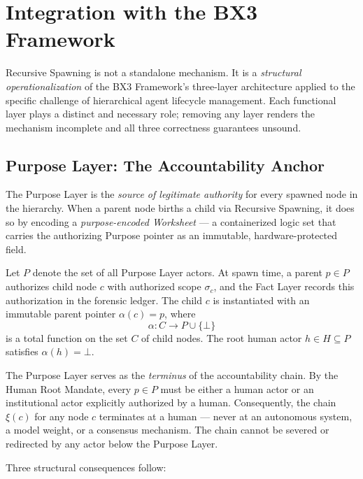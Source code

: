 \section{Integration with the BX3 Framework}
\label{sec:bx3-integration}

Recursive Spawning is not a standalone mechanism. It is a \textit{structural operationalization} of the BX3 Framework's three-layer architecture applied to the specific challenge of hierarchical agent lifecycle management. Each functional layer plays a distinct and necessary role; removing any layer renders the mechanism incomplete and all three correctness guarantees unsound.

\subsection{Purpose Layer: The Accountability Anchor}
\label{sec:purpose-anchor}

The Purpose Layer is the \textit{source of legitimate authority} for every spawned node in the hierarchy. When a parent node births a child via Recursive Spawning, it does so by encoding a \textit{purpose-encoded Worksheet} — a containerized logic set that carries the authorizing Purpose pointer as an immutable, hardware-protected field.

Let $P$ denote the set of all Purpose Layer actors. At spawn time, a parent $p \in P$ authorizes child node $c$ with authorized scope $\sigma_c$, and the Fact Layer records this authorization in the forensic ledger. The child $c$ is instantiated with an immutable parent pointer $\alpha(c) = p$, where
\begin{equation}
\alpha : C \rightarrow P \cup \{\bot\}
\tag{1}
\end{equation}
is a total function on the set $C$ of child nodes. The root human actor $h \in H \subseteq P$ satisfies $\alpha(h) = \bot$.

The Purpose Layer serves as the \textit{terminus} of the accountability chain. By the Human Root Mandate, every $p \in P$ must be either a human actor or an institutional actor explicitly authorized by a human. Consequently, the chain $\xi(c)$ for any node $c$ terminates at a human — never at an autonomous system, a model weight, or a consensus mechanism. The chain cannot be severed or redirected by any actor below the Purpose Layer.

Three structural consequences follow:

